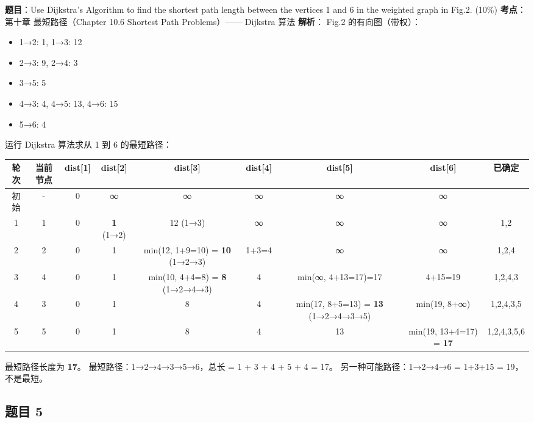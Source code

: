 \documentclass[10pt,a4paper,openany]{ctexbook}
\theoremstyle{definition}
\theoremstyle{remark}
\begin{document}
\textbf{题目}：Use Dijkstra's Algorithm to find the shortest path length between the vertices 1 and 6 in the weighted graph in Fig.2. (10\%)
\textbf{考点}：第十章 最短路径（Chapter 10.6 Shortest Path Problems）—— Dijkstra 算法
\textbf{解析}：
Fig.2 的有向图（带权）：
\begin{itemize}
\item 1→2: 1, 1→3: 12
\item 2→3: 9, 2→4: 3
\item 3→5: 5
\item 4→3: 4, 4→5: 13, 4→6: 15
\item 5→6: 4

\end{itemize}

运行 Dijkstra 算法求从 1 到 6 的最短路径：
\begin{center}
\begin{tabular}{ccccccccc}
\hline
轮次 & 当前节点 & dist[1] & dist[2] & dist[3] & dist[4] & dist[5] & dist[6] & 已确定 \\ \hline
初始 & - & 0 & ∞ & ∞ & ∞ & ∞ & ∞ & {} \\
1 & 1 & 0 & \textbf{1} (1→2) & 12 (1→3) & ∞ & ∞ & ∞ & {1,2} \\
2 & 2 & 0 & 1 & min(12, 1+9=10) = \textbf{10} (1→2→3) & 1+3=4 & ∞ & ∞ & {1,2,4} \\
3 & 4 & 0 & 1 & min(10, 4+4=8) = \textbf{8} (1→2→4→3) & 4 & min(∞, 4+13=17)=17 & 4+15=19 & {1,2,4,3} \\
4 & 3 & 0 & 1 & 8 & 4 & min(17, 8+5=13) = \textbf{13} (1→2→4→3→5) & min(19, 8+∞) & {1,2,4,3,5} \\
5 & 5 & 0 & 1 & 8 & 4 & 13 & min(19, 13+4=17) = \textbf{17} & {1,2,4,3,5,6} \\
\hline
\end{tabular}

\end{center}

最短路径长度为 \textbf{17}。
最短路径：1→2→4→3→5→6，总长 = 1 + 3 + 4 + 5 + 4 = 17。
另一种可能路径：1→2→4→6 = 1+3+15 = 19，不是最短。
\vspace{-2pt}

\subsection{题目 5}
\end{document}
